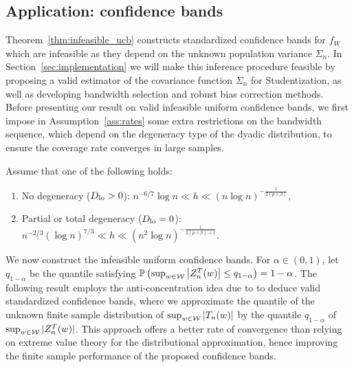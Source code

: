 \subsection{Application: confidence bands}

Theorem~\ref{thm:infeasible_ucb} constructs standardized confidence
bands for $f_W$ which are infeasible as they depend on the unknown population
variance $\Sigma_n$.
In Section~\ref{sec:implementation}
we will make this inference procedure
feasible by proposing a valid estimator of the covariance function $\Sigma_n$
for Studentization, as well as developing
bandwidth selection and robust bias correction methods.
Before presenting our result on valid infeasible uniform confidence bands,
we first impose in Assumption~\ref{ass:rates}
some extra restrictions on the bandwidth sequence,
which depend on the degeneracy type of the dyadic distribution,
to ensure the coverage rate converges in large samples.

\begin{assumption}
  \label{ass:rates}\onehalfspacing

  Assume that one of the following holds:

  \begin{enumerate}[label=(\roman*)]

    \item
      No degeneracy
      ($D_{\textup{lo}} > 0$):
      $n^{-6/7} \log n \ll h
      \ll (n \log n)^{-\frac{1}{2(p \wedge \beta)}}$,

    \item
      Partial or total degeneracy
      ($D_{\textup{lo}} = 0$):
      $n^{-2/3} (\log n)^{7/3} \ll h
      \ll (n^2 \log n)^{-\frac{1}{2(p \wedge \beta) + 1}}$.
  \end{enumerate}
\end{assumption}

We now construct the infeasible uniform confidence bands.
For $\alpha \in (0,1)$, let $q_{1-\alpha}$ be the quantile satisfying
$ \mathbb{P}\left(\sup_{w \in \mathcal{W}}
  \left| Z_n^T(w) \right|
\leq q_{1-\alpha} \right)
= 1 - \alpha$.
The following result employs the anti-concentration idea due to
\citet{chernozhukov2014anti} to deduce valid standardized confidence bands,
where we approximate the quantile of the unknown finite sample distribution of
$\sup_{w\in\mathcal{W}} |T_n(w)|$ by the quantile $q_{1-\alpha}$ of
$\sup_{w\in\mathcal{W}}|Z_n^T(w)|$. This approach offers a better rate of
convergence than relying on extreme value theory
for the distributional approximation,
hence improving the finite sample performance of the proposed confidence bands.

